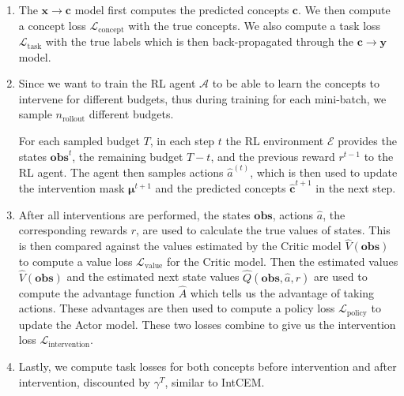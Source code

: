 \begin{enumerate}
    \item The $\mathbf{x} \to \mathbf{c}$ model first computes the predicted concepts $\mathbf{c}$.
    We then compute a concept loss $\mathcal{L}_{\text{concept}}$ with the true concepts.
    We also compute a task loss $\mathcal{L}_{\text{task}}$ with the true labels
    which is then 
    back-propagated through the $\mathbf{c} \to \mathbf{y}$ model.
    \item Since we want to train the RL agent $\mathcal{A}$ to be able to learn 
    the concepts to intervene for different budgets, thus during training 
    for each mini-batch, we sample $n_{\text{rollout}}$ different budgets.

    For each sampled budget $T$, 
    in each step $t$
    the RL environment $\mathcal{E}$ provides
    the states $\textbf{obs}^t$, the remaining budget $T - t$, 
    and the previous reward $r^{t-1}$ to the RL agent. The agent then samples actions
    $\hat{a}^{(t)}$, which is then used to update the intervention mask $\bm{\mu}^{t+1}$
    and the predicted concepts $\hat{\mathbf{c}}^{t+1}$ in the next step.

    \item After all interventions are performed, the states $\textbf{obs}$,
    actions $\hat{a}$,
    the corresponding rewards $r$, are used to calculate the true values of states.
    This is then compared against the values estimated by the Critic model
    $\hat{V}(\textbf{obs})$
    to compute a value loss $\mathcal{L}_{\text{value}}$ for the Critic model.
    Then the estimated values $\hat{V}(\textbf{obs})$ and the estimated 
    next state values $\hat{Q}(\textbf{obs}, \hat{a}, r)$
    are used to compute the advantage function $\hat{A}$ which tells us
    the advantage of taking actions. These advantages are then used to compute
    a policy loss $\mathcal{L}_{\text{policy}}$ to update the Actor model.
    These two losses combine to give us the intervention loss $\mathcal{L}_{\text{intervention}}$.
    \item Lastly, we compute task losses for both concepts before intervention and after intervention,
    discounted by $\gamma^T$, similar to IntCEM.
\end{enumerate}

